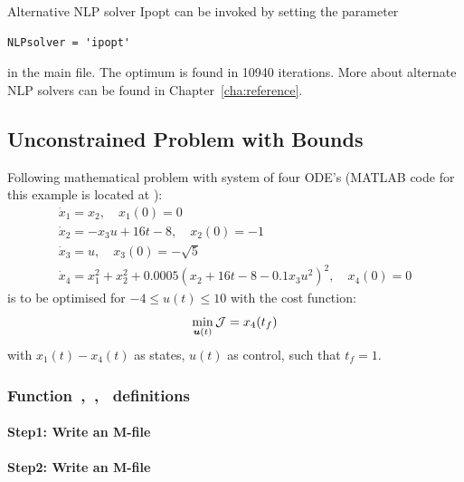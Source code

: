 Alternative NLP solver Ipopt can be invoked by setting the parameter
\begin{verbatim}
NLPsolver = 'ipopt'
\end{verbatim}
in the main file. The optimum is found in 10940 iterations. More about alternate
NLP solvers can be found in Chapter~\ref{cha:reference}.

\subsection{Unconstrained Problem with Bounds}
\label{sec:unconprobgradbound}

Following mathematical problem \citep{raj01,luu90_51} with system of
four ODE's (MATLAB code for this example is located at
):
\begin{gather}
\dot{x}_1 = x_{2}, \quad x_{1}(0) = 0\\
\dot{x}_2 = -x_{3}u + 16t - 8, \quad x_{2}(0) = -1\\
\dot{x}_3 = u, \quad x_{3}(0) = -\sqrt{5}\\
\dot{x}_4 = x_{1}^{2} + x_{2}^{2} + 0.0005(x_{2} + 16t - 8 -
0.1x_{3}u^{2})^{2}, \quad x_{4}(0) = 0
\end{gather} is to be optimised for $-4 \leq u(t) \leq 10$ with the
cost function:  
\begin{equation}
\min_{\ve{u}(t)} \mf{J} = x_{4}(t_{f}) \label{eq:ucpgb}
\end{equation} with $x_1(t) - x_4(t)$ as states, $u(t)$ as control,
such that $t_{f}=1$. 

\subsubsection{Function~,~,~  definitions}
\label{sec:unconprbgradbound-fundef}

\paragraph{Step1: Write an M-file~}

{\small }

\paragraph{Step2: Write an M-file~}

{\small }

